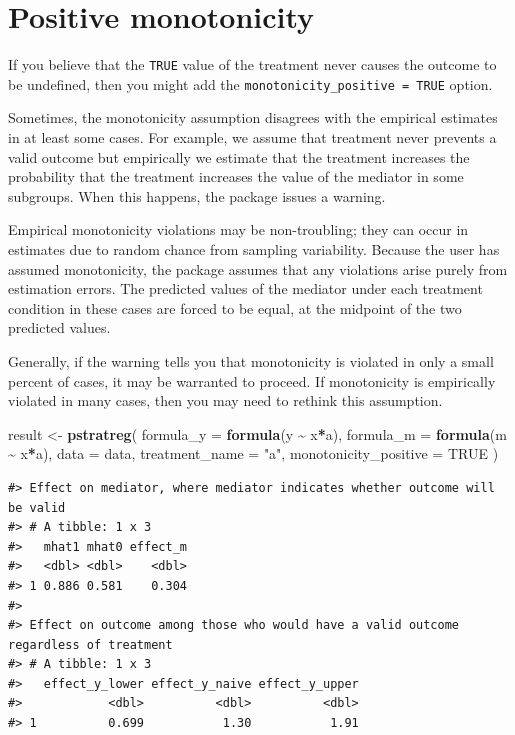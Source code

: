 \documentclass[
]{book}
\newenvironment{Shaded}{\begin{snugshade}}{\end{snugshade}}
\newcommand{\AttributeTok}[1]{\textcolor[rgb]{0.13,0.29,0.53}{#1}}
\newcommand{\ConstantTok}[1]{\textcolor[rgb]{0.56,0.35,0.01}{#1}}
\newcommand{\FunctionTok}[1]{\textcolor[rgb]{0.13,0.29,0.53}{\textbf{#1}}}
\newcommand{\NormalTok}[1]{#1}
\newcommand{\OtherTok}[1]{\textcolor[rgb]{0.56,0.35,0.01}{#1}}
\newcommand{\SpecialCharTok}[1]{\textcolor[rgb]{0.81,0.36,0.00}{\textbf{#1}}}
\newcommand{\StringTok}[1]{\textcolor[rgb]{0.31,0.60,0.02}{#1}}
\begin{document}
\hypertarget{positive-monotonicity}{%
\section{Positive monotonicity}\label{positive-monotonicity}}

If you believe that the \texttt{TRUE} value of the treatment never causes the outcome to be undefined, then you might add the \texttt{monotonicity\_positive\ =\ TRUE} option.

Sometimes, the monotonicity assumption disagrees with the empirical estimates in at least some cases. For example, we assume that treatment never prevents a valid outcome but empirically we estimate that the treatment increases the probability that the treatment increases the value of the mediator in some subgroups. When this happens, the package issues a warning.

Empirical monotonicity violations may be non-troubling; they can occur in estimates due to random chance from sampling variability. Because the user has assumed monotonicity, the package assumes that any violations arise purely from estimation errors. The predicted values of the mediator under each treatment condition in these cases are forced to be equal, at the midpoint of the two predicted values.

Generally, if the warning tells you that monotonicity is violated in only a small percent of cases, it may be warranted to proceed. If monotonicity is empirically violated in many cases, then you may need to rethink this assumption.

\begin{Shaded}
\begin{Highlighting}[]
\NormalTok{result }\OtherTok{\textless{}{-}} \FunctionTok{pstratreg}\NormalTok{(}
  \AttributeTok{formula\_y =} \FunctionTok{formula}\NormalTok{(y }\SpecialCharTok{\textasciitilde{}}\NormalTok{ x}\SpecialCharTok{*}\NormalTok{a),}
  \AttributeTok{formula\_m =} \FunctionTok{formula}\NormalTok{(m }\SpecialCharTok{\textasciitilde{}}\NormalTok{ x}\SpecialCharTok{*}\NormalTok{a),}
  \AttributeTok{data =}\NormalTok{ data,}
  \AttributeTok{treatment\_name =} \StringTok{"a"}\NormalTok{,}
  \AttributeTok{monotonicity\_positive =} \ConstantTok{TRUE}
\NormalTok{)}
\end{Highlighting}
\end{Shaded}

\begin{verbatim}
#> Effect on mediator, where mediator indicates whether outcome will be valid
#> # A tibble: 1 x 3
#>   mhat1 mhat0 effect_m
#>   <dbl> <dbl>    <dbl>
#> 1 0.886 0.581    0.304
#> 
#> Effect on outcome among those who would have a valid outcome regardless of treatment
#> # A tibble: 1 x 3
#>   effect_y_lower effect_y_naive effect_y_upper
#>            <dbl>          <dbl>          <dbl>
#> 1          0.699           1.30           1.91
\end{verbatim}
\end{document}
